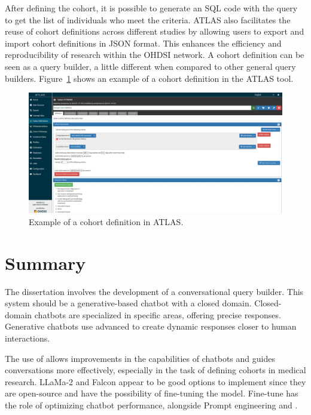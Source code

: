 After defining the cohort, it is possible to generate an SQL code with the query to get the list of individuals who meet the criteria. ATLAS also facilitates the reuse of cohort definitions across different studies by allowing users to export and import cohort definitions in JSON format. This enhances the efficiency and reproducibility of research within the OHDSI network. A cohort definition can be seen as a query builder, a little different when compared to other general query builders. Figure~\ref{fig_atlas} shows an example of a cohort definition in the ATLAS tool.


\begin{figure}[ht]
    \includegraphics[width=\textwidth]{figs/chapter2/atlas.png}
    \centering
    \caption[Example of a cohort definition in ATLAS]{Example of a cohort definition in ATLAS.}
    \label{fig_atlas}
\end{figure}


\section{Summary}

The dissertation involves the development of a conversational query builder. This system should be a generative-based chatbot with a closed domain. Closed-domain chatbots are specialized in specific areas, offering precise responses. Generative chatbots use advanced {\lm} to create dynamic responses closer to human interactions.

The use of {\llm} allows improvements in the {\nlg} capabilities of chatbots and guides conversations more effectively, especially in the task of defining cohorts in medical research. LLaMa-2 and Falcon appear to be good options to implement since they are open-source and have the possibility of fine-tuning the model. Fine-tune has the role of optimizing chatbot performance, alongside Prompt engineering and {\rag}. 

